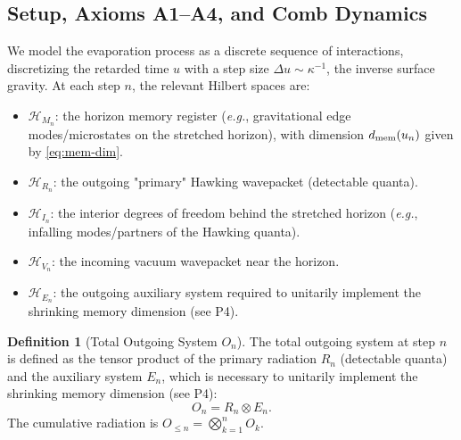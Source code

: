 \documentclass[11pt,a4paper]{article}
\newcommand{\eg}{\textit{e.g.}\xspace}
\theoremstyle{plain}
\theoremstyle{definition}
\newtheorem{definition}[theorem]{Definition}
\theoremstyle{remark}
\begin{document}
\subsection{Setup, Axioms A1--A4, and Comb Dynamics}\label{sec:comb-setup}\label{sec:setup}
\label{sec:formalism}
We model the evaporation process as a discrete sequence of interactions, discretizing the retarded time $u$ with a step size $\Delta u \sim \kappa^{-1}$, the inverse surface gravity. At each step $n$, the relevant Hilbert spaces are:
\begin{itemize}
    \item $\mathcal{H}_{M_n}$: the horizon memory register (\eg, gravitational edge modes/microstates on the stretched horizon), with dimension $d_{\rm mem}(u_n)$ given by \eqref{eq:mem-dim}.
    \item $\mathcal{H}_{R_n}$: the outgoing "primary" Hawking wavepacket (detectable quanta).
    \item $\mathcal{H}_{I_n}$: the interior degrees of freedom behind the stretched horizon (\eg, infalling modes/partners of the Hawking quanta).
    \item $\mathcal{H}_{V_n}$: the incoming vacuum wavepacket near the horizon.
    \item $\mathcal{H}_{E_n}$: the outgoing auxiliary system required to unitarily implement the shrinking memory dimension (see P4).
\end{itemize}

\begin{definition}[Total Outgoing System $O_n$]
The total outgoing system at step $n$ is defined as the tensor product of the primary radiation $R_n$ (detectable quanta) and the auxiliary system $E_n$, which is necessary to unitarily implement the shrinking memory dimension (see P4):
\begin{equation}
    O_n = R_n \otimes E_n.
\end{equation}
The cumulative radiation is $O_{\le n}=\bigotimes_{k=1}^n O_k$.
\end{definition}
\end{document}
